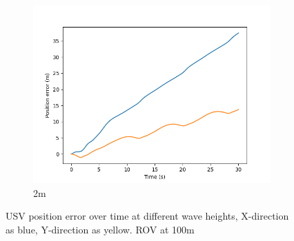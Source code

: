 \documentclass[class=article, crop=false]{standalone}
\begin{document}
\begin{figure}
\begin{subfigure}[b]{0.48\textwidth}
        \includegraphics{scenario1/rov-100m/2.0m/usv_pos_error_uncontrolled}
        \caption{2m}
        \label{}
    \end{subfigure}
    \caption{USV position error over time at different wave heights, X-direction as blue, Y-direction as yellow. ROV at 100m}
    \label{}
\end{figure}
\end{document}
